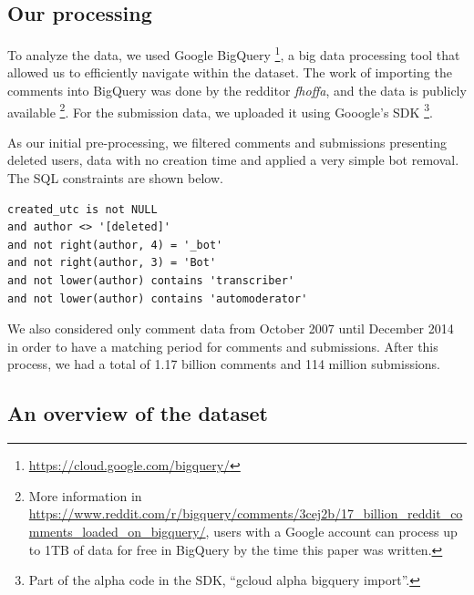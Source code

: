 \subsection{Our processing}

To analyze the data, we used Google BigQuery \footnote{\url{https://cloud.google.com/bigquery/}}, a big data processing tool that allowed us to efficiently navigate within the dataset. The work of importing the comments into BigQuery was done by the redditor \textit{fhoffa}, and the data is publicly available \footnote{More information in \url{https://www.reddit.com/r/bigquery/comments/3cej2b/17_billion_reddit_comments_loaded_on_bigquery/}, users with a Google account can process up to 1TB of data for free in BigQuery by the time this paper was written.}. For the submission data, we uploaded it using Gooogle's SDK \footnote{Part of the alpha code in the SDK, ``gcloud alpha bigquery import''.}.

As our initial pre-processing, we filtered comments and submissions presenting deleted users, data with no creation time and applied a very simple bot removal. The SQL constraints are shown below.

\begin{verbatim}
created_utc is not NULL
and author <> '[deleted]'
and not right(author, 4) = '_bot'
and not right(author, 3) = 'Bot'
and not lower(author) contains 'transcriber'
and not lower(author) contains 'automoderator'
\end{verbatim}

We also considered only comment data from October 2007 until December 2014 in order to have a matching period for comments and submissions. After this process, we had a total of 1.17 billion comments and 114 million submissions.

\subsection{An overview of the dataset}



